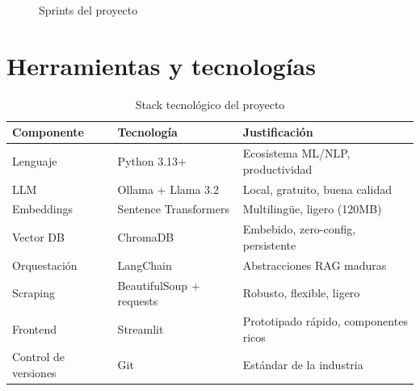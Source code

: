 \documentclass[12pt, a4paper, twoside]{report}
\begin{document}
\begin{figure}[H]
\centering
{}
\caption{Sprints del proyecto}
\label{fig:sprints}
\end{figure}

\section{Herramientas y tecnolog\'ias}

\begin{table}[H]
\centering
\caption{Stack tecnol\'ogico del proyecto}
\label{tab:stack}
\begin{tabularx}{\textwidth}{llX}
\toprule
\textbf{Componente} & \textbf{Tecnolog\'ia} & \textbf{Justificaci\'on} \\
\midrule
Lenguaje & Python 3.13+ & Ecosistema ML/NLP, productividad \\
LLM & Ollama + Llama 3.2 & Local, gratuito, buena calidad \\
Embeddings & Sentence Transformers & Multiling\"ue, ligero (120MB) \\
Vector DB & ChromaDB & Embebido, zero-config, persistente \\
Orquestaci\'on & LangChain & Abstracciones RAG maduras \\
Scraping & BeautifulSoup + requests & Robusto, flexible, ligero \\
Frontend & Streamlit & Prototipado r\'apido, componentes ricos \\
Control de versiones & Git & Est\'andar de la industria \\
\bottomrule
\end{tabularx}
\end{table}
\end{document}
